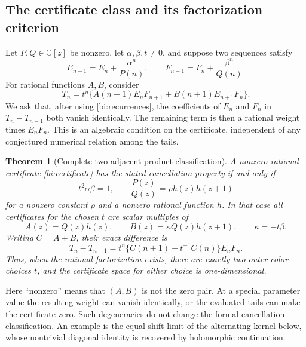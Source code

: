 \documentclass[11pt,letterpaper]{article}
\numberwithin{equation}{section}
\newtheorem{theorem}{Theorem}[section]
\theoremstyle{definition}
\theoremstyle{remark}
\newcommand{\C}{\mathbb C}
\begin{document}
\subsection{The certificate class and its factorization criterion}

Let $P,Q\in\C[z]$ be nonzero, let $\alpha,\beta,t\ne0$, and suppose
two sequences satisfy
\begin{equation}\label{bi:recurrences}
 E_{n-1}=E_n+\frac{\alpha^n}{P(n)},\qquad
 F_{n-1}=F_n+\frac{\beta^n}{Q(n)}.
\end{equation}
For rational functions $A,B$, consider
\begin{equation}\label{bi:certificate}
 T_n=t^n\{A(n+1)E_nF_{n+1}+B(n+1)E_{n+1}F_n\}.
\end{equation}
We ask that, after using \eqref{bi:recurrences}, the coefficients of
$E_n$ and $F_n$ in $T_n-T_{n-1}$ both vanish identically. The remaining
term is then a rational weight times $E_nF_n$. This is an algebraic
condition on the certificate, independent of any conjectured numerical
relation among the tails.

\begin{theorem}[Complete two-adjacent-product classification]
\label{bi:classification}
A nonzero rational certificate \eqref{bi:certificate} has the stated
cancellation property if and only if
\begin{equation}\label{bi:criterion}
 t^2\alpha\beta=1,\qquad
 \frac{P(z)}{Q(z)}=\rho h(z)h(z+1)
\end{equation}
for a nonzero constant $\rho$ and a nonzero rational function $h$.
In that case all certificates for the chosen $t$ are scalar multiples
of
\begin{equation}\label{bi:AB}
 A(z)=Q(z)h(z),\qquad B(z)=\kappa Q(z)h(z+1),\qquad
 \kappa=-t\beta.
\end{equation}
Writing $C=A+B$, their exact difference is
\begin{equation}\label{bi:difference}
 T_n-T_{n-1}
   =t^n\{C(n+1)-t^{-1}C(n)\}E_nF_n.
\end{equation}
Thus, when the rational factorization exists, there are exactly two
outer-color choices $t$, and the certificate space for either choice
is one-dimensional.
\end{theorem}

Here ``nonzero'' means that $(A,B)$ is not the zero pair. At a special
parameter value the resulting weight can vanish identically, or the
evaluated tails can make the certificate zero. Such degeneracies do not
change the formal cancellation classification. An example is the
equal-shift limit of the alternating kernel below, whose nontrivial
diagonal identity is recovered by holomorphic continuation.
\end{document}
